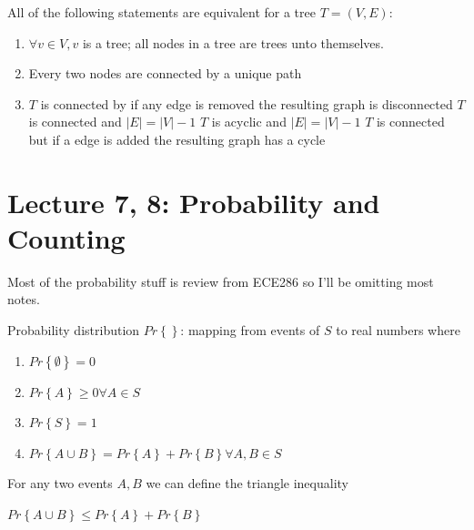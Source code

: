 \documentclass[../notes.tex]{subfiles}
\begin{document}
\begin{theorem}
	All of the following statements are equivalent for a tree $ T = (V, E) $:

	\begin{enumerate}
		\item $ \forall v \in V, v $ is a tree; all nodes in a tree are trees unto themselves.
		\item Every two nodes are connected by a unique path
		\item $ T $ is connected by if any edge is removed the resulting graph is disconnected
			$ T $ is connected and $ |E| = |V| - 1 $   
			$ T $ is acyclic and $ |E| = |V| - 1 $   
			$ T $ is connected but if a edge is added the resulting graph has a cycle
	\end{enumerate}



\end{theorem}






\section{Lecture 7, 8: Probability and Counting}

Most of the probability stuff is review from ECE286 so I'll be omitting most notes.


\begin{definition}
	Probability distribution $ Pr \left\{  \right\}  $: mapping from events of $ S $ to real numbers where

	\begin{enumerate}
		\item $ Pr \left\{ \emptyset \right\} = 0 $
		\item $ Pr \left\{ A \right\} \ge  0  \forall A \in S $
		\item $ Pr \left\{ S \right\} = 1 $
		\item $ Pr \left\{ A \cup B \right\} = Pr \left\{ A \right\} + Pr \left\{ B \right\} \forall A, B \in S $
	\end{enumerate}
\end{definition}

For any two events $ A, B $ we can define the triangle inequality
\begin{definition}
	$ Pr \left\{ A \cup B \right\} \le Pr \left\{ A \right\} + Pr \left\{ B \right\} $
\end{definition}
\end{document}
